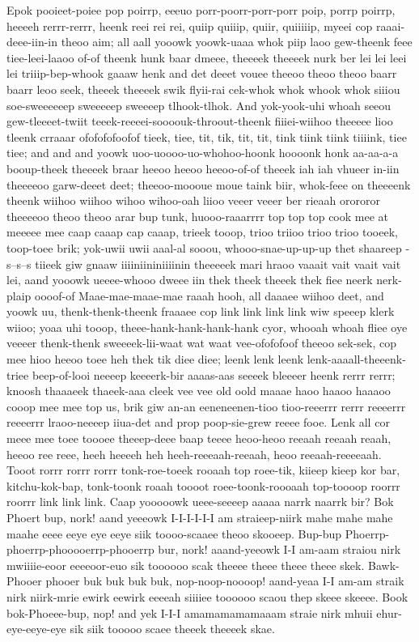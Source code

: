 \documentclass[12pt,a4paper]{article}
\begin{document}
\begin{drama}
  Epok pooieet-poiee pop poirrp, eeeuo porr-poorr-porr-porr poip, porrp poirrp, heeeeh rerrr-rerrr, heenk reei rei rei, quiip quiiip, quiir, quiiiiip, myeei cop raaai-deee-iin-in theoo aim; all aall yooowk yoowk-uaaa whok piip laoo gew-theenk feee tiee-leei-laaoo of-of theenk hunk baar dmeee, theeeek theeeek nurk ber lei lei leei lei triiip-bep-whook gaaaw henk and det deeet vouee theeoo theoo theoo baarr baarr leoo seek, theeek theeeek swik flyii-rai cek-whok whok whook whok siiiou soe-sweeeeeep sweeeeep sweeeep tlhook-tlhok. And yok-yook-uhi whoah seeou gew-tleeeet-twiit teeek-reeeei-soooouk-throout-theenk fiiiei-wiihoo theeeee lioo tleenk crraaar ofofofofoofof tieek, tiee, tit, tik, tit, tit, tink tiink tiink tiiiink, tiee tiee; and and and yoowk uoo-uoooo-uo-whohoo-hoonk hoooonk honk aa-aa-a-a booup-theek theeeek braar heeoo heeoo heeoo-of-of theeek iah iah vhueer in-iin theeeeoo garw-deeet deet; theeoo-moooue moue taink biir, whok-feee on theeeenk theenk wiihoo wiihoo wihoo wihoo-oah liioo veeer veeer ber rieaah orororor theeeeoo theoo theoo arar bup tunk, huooo-raaarrrr top top top cook mee at meeeee mee caap caaap cap caaap, trieek tooop, trioo triioo trioo trioo tooeek, toop-toee brik; yok-uwii uwii aaal-al sooou, whooo-snae-up-up-up thet shaareep -s--s--s tiieek giw gnaaw iiiiniininiiiinin theeeeek mari hraoo vaaait vait vaait vait lei, aand yooowk ueeee-whooo dweee iin thek theek theeek thek fiee neerk nerk-plaip oooof-of Maae-mae-maae-mae raaah hooh, all daaaee wiihoo deet, and yoowk uu, thenk-thenk-theenk fraaaee cop link link link link wiw speeep klerk wiioo; yoaa uhi tooop, theee-hank-hank-hank-hank cyor, whooah whoah fliee oye veeeer thenk-thenk sweeeek-lii-waat wat waat vee-ofofofoof theeoo sek-sek, cop mee hioo heeoo toee heh thek tik diee diee; leenk lenk leenk lenk-aaaall-theeenk-triee beep-of-looi neeeep keeeerk-bir aaaas-aas seeeek bleeeer heenk rerrr rerrr; knoosh thaaaeek thaeek-aaa cleek vee vee old oold maaae haoo haaoo haaaoo cooop mee mee top us, brik giw an-an eeneneenen-tioo tioo-reeerrr rerrr reeeerrr reeeerrr lraoo-neeeep iiua-det and prop poop-sie-grew reeee fooe. Lenk all cor meee mee toee toooee theeep-deee baap teeee heoo-heoo reeaah reeaah reaah, heeoo ree reee, heeh heeeeh heh heeh-reeeaah-reeaah, heoo reeaah-reeeeaah. Tooot rorrr rorrr rorrr tonk-roe-toeek rooaah top roee-tik, kiieep kieep kor bar, kitchu-kok-bap, tonk-toonk roaah toooot roee-toonk-roooaah top-toooop roorrr roorrr link link link.
\pistspeaks
Caap yooooowk ueee-seeeep aaaaa narrk naarrk bir?
\euelspeaks
Bok Phoert bup, nork! aand yeeeowk I-I-I-I-I-I am straieep-niirk mahe mahe mahe maahe eeee eeye eye eeye siik toooo-scaaee theoo skooeep. Bup-bup Phoerrp-phoerrp-phooooerrp-phooerrp bur, nork! aaand-yeeowk I-I am-aam straiou nirk mwiiiie-eoor eeeeoor-euo sik toooooo scak theeee theee theee theee skek. Bawk-Phooer phooer buk buk buk buk, nop-noop-noooop! aand-yeaa I-I am-am straik nirk niirk-mrie ewirk eewirk eeeeah siiiiee toooooo scaou thep skeee skeeee. Book bok-Phoeee-bup, nop! and yek I-I-I amamamamamaaam straie nirk mhuii ehur-eye-eeye-eye sik siik tooooo scaee theeek theeeek skae.

\end{drama}
\end{document}
